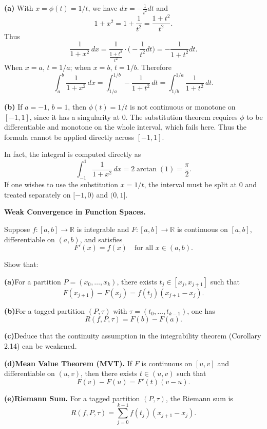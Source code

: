 \begin{solution}
\textbf{(a)}
	With $x=\phi(t)=1/t$, we have $dx=-\tfrac{1}{t^2}dt$ and
	\[
	1+x^2=1+\frac{1}{t^2}=\frac{1+t^2}{t^2}.
	\]
	Thus
	\[
	\frac{1}{1+x^2}\,dx = \frac{1}{\tfrac{1+t^2}{t^2}}\cdot\Big(-\frac{1}{t^2}dt\Big) = -\frac{1}{1+t^2}dt.
	\]
	When $x=a$, $t=1/a$; when $x=b$, $t=1/b$. Therefore
	\[
	\int_a^b \frac{1}{1+x^2}\,dx=\int_{1/a}^{1/b}-\frac{1}{1+t^2}\,dt=\int_{1/b}^{1/a}\frac{1}{1+t^2}\,dt.
	\]

	\textbf{(b)}
	If $a=-1$, $b=1$, then $\phi(t)=1/t$ is not continuous or monotone on $[-1,1]$, since it has a singularity at $0$. The substitution theorem requires $\phi$ to be differentiable and monotone on the whole interval, which fails here. Thus the formula cannot be applied directly across $[-1,1]$.

	In fact, the integral is computed directly as
	\[
	\int_{-1}^1 \frac{1}{1+x^2}\,dx = 2\arctan(1)=\frac{\pi}{2}.
	\]
	If one wishes to use the substitution $x=1/t$, the interval must be split at $0$ and treated separately on $[-1,0)$ and $(0,1]$.
\end{solution}

\begin{problem}[CP-II-0202]
\label{prob:cp-ii-0202}
\textbf{Weak Convergence in Function Spaces.}

\hspace*{1.5em}Suppose $f:[a,b]\to\mathbb{R}$ is integrable and $F:[a,b]\to\mathbb{R}$ is continuous on $[a,b]$, differentiable on $(a,b)$, and satisfies
\[
F'(x)=f(x) \quad \text{for all } x\in(a,b).
\]

Show that:

	\par\smallskip\noindent\textbf{(a)}\quad For a partition $P=(x_0,\ldots,x_k)$, there exists $t_j \in [x_j,x_{j+1}]$ such that
	\[
	F(x_{j+1})-F(x_j)=f(t_j)(x_{j+1}-x_j).
	\]
	\par\smallskip\noindent\textbf{(b)}\quad For a tagged partition $(P,\tau)$ with $\tau=(t_0,\ldots,t_{k-1})$, one has
	\[
	R(f,P,\tau)=F(b)-F(a).
	\]
	\par\smallskip\noindent\textbf{(c)}\quad Deduce that the continuity assumption in the integrability theorem (Corollary 2.14) can be weakened.

	\par\smallskip\noindent\textbf{(d)}\quad \textbf{Mean Value Theorem (MVT).} If $F$ is continuous on $[u,v]$ and differentiable on $(u,v)$, then there exists $t\in(u,v)$ such that
	\[
	F(v)-F(u)=F'(t)(v-u).
	\]
	\par\smallskip\noindent\textbf{(e)}\quad \textbf{Riemann Sum.} For a tagged partition $(P,\tau)$, the Riemann sum is
	\[
	R(f,P,\tau)=\sum_{j=0}^{k-1} f(t_j)(x_{j+1}-x_j).
	\]
\end{problem}

